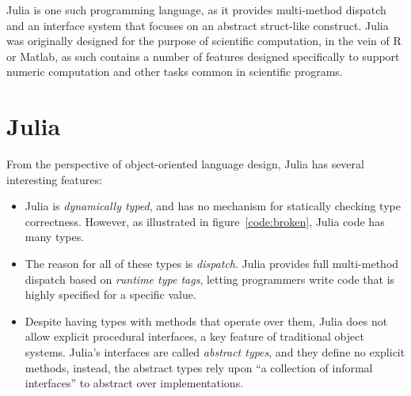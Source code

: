 \documentclass[preprint]{sigplanconf}
\begin{document}
Julia is one such programming language, as it provides multi-method dispatch 
and an interface system that focuses on an abstract struct-like construct. 
Julia was originally designed for the purpose of scientific computation, in the vein of 
R or Matlab\cite{bezan}, as such contains a number of features designed specifically to support 
numeric computation and other tasks common in scientific programs.


\section{Julia}

From the perspective of object-oriented language design, Julia has several 
interesting features:
\begin{itemize}
\item Julia is \emph{dynamically typed}, and has no mechanism for statically
checking type correctness. However, as illustrated in figure~\ref{code:broken},
Julia code has many types.
\item The reason for all of these types is \emph{dispatch}. Julia provides 
full multi-method dispatch based on \emph{runtime type tags}, letting programmers
write code that is highly specified for a specific value. 
\item Despite having types with methods that operate over them, Julia does not 
allow explicit procedural interfaces, a key feature of traditional object 
systems. Julia's interfaces are called \emph{abstract types}, and they define no 
explicit methods, instead, the abstract types rely upon ``a collection of informal interfaces''
\cite{juliadocu} to abstract over implementations. 
\end{itemize}
\end{document}
